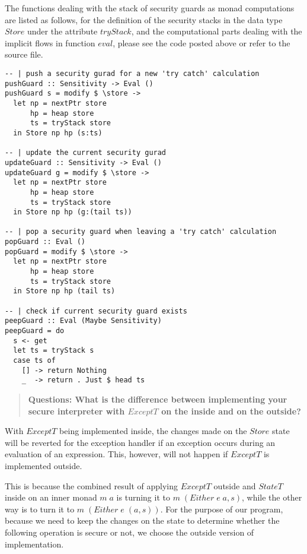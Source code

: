 \documentclass[10pt]{article}
\begin{document}
The functions dealing with the stack of security guards as monad computations are listed as follows, for the definition of the security stacks in the data type $Store$ under the attribute $tryStack$, and the computational parts dealing with the implicit flows in function $eval$, please see the code posted above or refer to the source file.
\begin{lstlisting}
-- | push a security gurad for a new 'try catch' calculation                                                                                                                                  
pushGuard :: Sensitivity -> Eval ()
pushGuard s = modify $ \store ->
  let np = nextPtr store
      hp = heap store
      ts = tryStack store
  in Store np hp (s:ts)

-- | update the current security gurad                                                                                                                                                        
updateGuard :: Sensitivity -> Eval ()
updateGuard g = modify $ \store ->
  let np = nextPtr store
      hp = heap store
      ts = tryStack store
  in Store np hp (g:(tail ts))

-- | pop a security guard when leaving a 'try catch' calculation                                                                                                                              
popGuard :: Eval ()
popGuard = modify $ \store ->
  let np = nextPtr store
      hp = heap store
      ts = tryStack store
  in Store np hp (tail ts)

-- | check if current security guard exists                                                                                                                                                   
peepGuard :: Eval (Maybe Sensitivity)
peepGuard = do
  s <- get
  let ts = tryStack s
  case ts of
    [] -> return Nothing
    _  -> return . Just $ head ts
\end{lstlisting}

\begin{quote}
\textbf{Questions: What is the difference between implementing your secure interpreter with $ExceptT$ on the inside and on the outside?}
\end{quote}
With $ExceptT$ being implemented inside, the changes made on the $Store$ state will be reverted for the exception handler if an exception occurs during an evaluation of an expression. This, however, will not happen if $ExceptT$ is implemented outside. 

This is because the combined result of applying $ExceptT$ outside and $StateT$ inside on an inner monad  $m\; a$ is turning it to $m\; (Either\; e\; a, s)$, while the other way is to turn it to $m\; (Either\; e\; (a,s))$. For the purpose of our program, because we need to keep the changes on the state to determine whether the following operation is secure or not, we choose the outside version of implementation.
\end{document}
